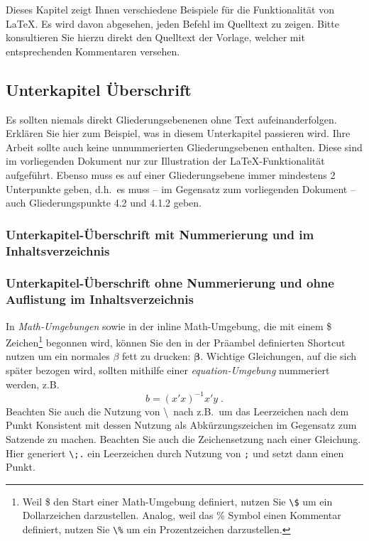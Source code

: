 \documentclass[a4paper,12pt]{scrartcl} %
\newcommand{\bs}{\boldsymbol}  %
\begin{document}
Dieses Kapitel zeigt Ihnen verschiedene Beispiele für die Funktionalität von \LaTeX. Es wird davon abgesehen, jeden Befehl im Quelltext zu zeigen. Bitte konsultieren Sie hierzu direkt den Quelltext der Vorlage, welcher mit entsprechenden Kommentaren versehen.

\subsection{Unterkapitel Überschrift} %

Es sollten niemals direkt Gliederungsebenenen ohne Text aufeinanderfolgen. Erklären Sie hier zum Beispiel, was in diesem Unterkapitel passieren wird. Ihre Arbeit sollte auch keine unnummerierten Gliederungsebenen enthalten. Diese sind im vorliegenden Dokument nur zur Illustration der \LaTeX-Funktionalität aufgeführt. Ebenso muss es auf einer Gliederungsebene immer mindestens 2 Unterpunkte geben, d.h.\ es muss -- im Gegensatz zum vorliegenden Dokument -- auch Gliederungspunkte 4.2 und 4.1.2 geben.

\subsubsection{Unterkapitel-Überschrift mit Nummerierung und im Inhaltsverzeichnis}
\subsubsection*{Unterkapitel-Überschrift ohne Nummerierung und ohne Auflistung im Inhaltsverzeichnis} %

In \emph{Math-Umgebungen} sowie in der inline Math-Umgebung, die mit einem \$ Zeichen\footnote{Weil \$ den Start einer Math-Umgebung definiert, nutzen Sie \texttt{\textbackslash\$} um ein Dollarzeichen darzustellen. Analog, weil das \% Symbol einen Kommentar definiert, nutzen Sie \texttt{\textbackslash\%} um ein Prozentzeichen darzustellen.} begonnen wird, können Sie den in der Präambel definierten Shortcut nutzen um ein normales $\beta$ fett zu drucken: $\bs \beta$. Wichtige Gleichungen, auf die sich später bezogen wird, sollten mithilfe einer \emph{equation-Umgebung} nummeriert werden, z.B.\
\begin{equation}\label{eq:ols}
	b = (x'x)^{-1}x'y \;.
\end{equation}
Beachten Sie auch die Nutzung von \textbackslash\ nach z.B.\ um das Leerzeichen nach dem Punkt Konsistent mit dessen Nutzung als Abkürzungszeichen im Gegensatz zum Satzende zu machen. Beachten Sie auch die Zeichensetzung nach einer Gleichung. Hier generiert \verb|\;.| ein Leerzeichen durch Nutzung von \verb|;| und setzt dann einen Punkt.
\end{document}
